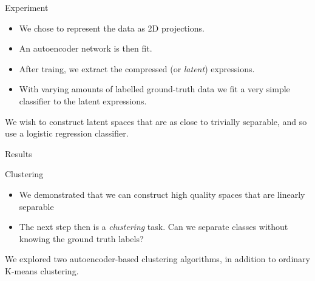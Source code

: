\documentclass[notes]{beamer}
\begin{document}
\begin{frame}[t]{Experiment}
	\begin{itemize}
		\item We chose to represent the data as 2D projections.
		\item An autoencoder network is then fit.
		\item After traing, we extract the compressed (or \textit{latent}) expressions.
		\item With varying amounts of labelled ground-truth data we fit a very simple classifier to the latent expressions.
	\end{itemize}
	We wish to construct latent spaces that are as close to trivially separable, and so use a logistic regression classifier.
\end{frame}



\begin{frame}[t]{Results}
	\begin{figure}[h]
	\end{figure}
\end{frame}


\begin{frame}[t]{Clustering}
	\begin{itemize}
		\item We demonstrated that we can construct high quality spaces that are linearly separable
		\item The next step then is a \textit{clustering} task. Can we separate classes without knowing the ground truth labels? 
	\end{itemize}
	We explored two autoencoder-based clustering algorithms, in addition to ordinary K-means clustering.
\end{frame}
\end{document}
